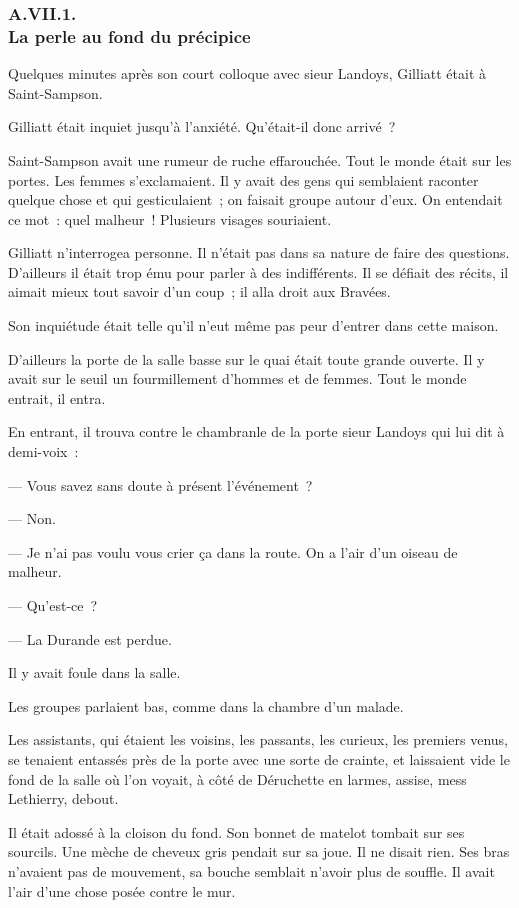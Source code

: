 \documentclass[french,twoside]{book} %
\begin{document}
  \subsubsection[{A.VII.1. La perle au fond du précipice}]{A.VII.1. \\
La perle au fond du précipice}
\noindent Quelques minutes après son court colloque avec sieur Landoys, Gilliatt était à Saint-Sampson.\par
Gilliatt était inquiet jusqu’à l’anxiété. Qu’était-il donc arrivé ?\par
Saint-Sampson avait une rumeur de ruche effarouchée. Tout le monde était sur les portes. Les femmes s’exclamaient. Il y avait des gens qui semblaient raconter quelque chose et qui gesticulaient ; on faisait groupe autour d’eux. On entendait ce mot : quel malheur ! Plusieurs visages souriaient.\par
Gilliatt n’interrogea personne. Il n’était pas dans sa nature de faire des questions. D’ailleurs il était trop ému pour parler à des indifférents. Il se défiait des récits, il aimait mieux tout savoir d’un coup ; il alla droit aux Bravées.\par
Son inquiétude était telle qu’il n’eut même pas peur d’entrer dans cette maison.\par
 D’ailleurs la porte de la salle basse sur le quai était toute grande ouverte. Il y avait sur le seuil un fourmillement d’hommes et de femmes. Tout le monde entrait, il entra.\par
En entrant, il trouva contre le chambranle de la porte sieur Landoys qui lui dit à demi-voix :\par
— Vous savez sans doute à présent l’événement ?\par
— Non.\par
— Je n’ai pas voulu vous crier ça dans la route. On a l’air d’un oiseau de malheur.\par
— Qu’est-ce ?\par
— La Durande est perdue.\par
Il y avait foule dans la salle.\par
Les groupes parlaient bas, comme dans la chambre d’un malade.\par
Les assistants, qui étaient les voisins, les passants, les curieux, les premiers venus, se tenaient entassés près de la porte avec une sorte de crainte, et laissaient vide le fond de la salle où l’on voyait, à côté de Déruchette en larmes, assise, mess Lethierry, debout.\par
Il était adossé à la cloison du fond. Son bonnet de matelot tombait sur ses sourcils. Une mèche de cheveux gris pendait sur sa joue. Il ne disait rien. Ses bras n’avaient pas de mouvement, sa bouche semblait n’avoir plus de souffle. Il avait l’air d’une chose posée contre le mur.\par
\end{document}
